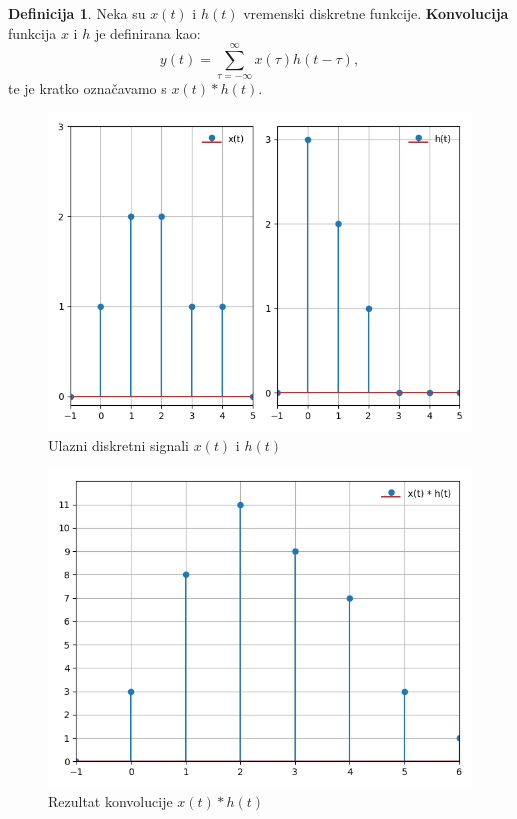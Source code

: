 \documentclass[times, utf8, diplomski]{fer}
\theoremstyle{definition}
\newtheorem{definition}{Definicija}[section]
\begin{document}
\theoremstyle{definition}
\begin{definition}
Neka su $x(t)$ i $h(t)$ vremenski diskretne funkcije. \textbf{Konvolucija} funkcija $x$ i $h$ je definirana kao:
\begin{equation}
y(t) = \sum_{\tau=-\infty}^{\infty}x(\tau)h(t-\tau),
\end{equation}
te je kratko označavamo s $x(t) * h(t)$.
\end{definition}

\begin{figure}[h]
\centering
\includegraphics[scale=0.45]{convolution_discrete.png}
\caption{Ulazni diskretni signali $x(t)$ i $h(t)$}
\end{figure}



\begin{figure}[h]
\centering
\includegraphics[scale=0.5]{convolution_result.png}
\caption{Rezultat konvolucije $x(t) * h(t)$}
\end{figure}
\end{document}
